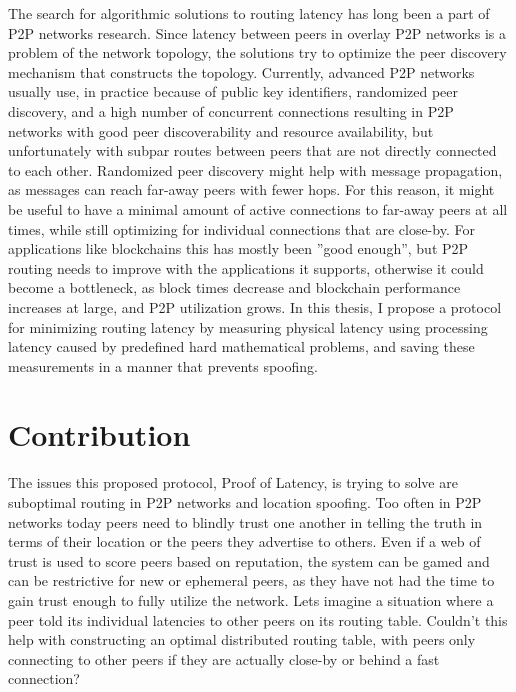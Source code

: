 The search for algorithmic solutions to routing latency has long been a part of P2P networks research. Since latency between peers in overlay P2P networks is a problem of the network topology, the solutions try to optimize the peer discovery mechanism that constructs the topology. Currently, advanced P2P networks usually use, in practice because of public key identifiers, randomized peer discovery, and a high number of concurrent connections resulting in P2P networks with good peer discoverability and resource availability, but unfortunately with subpar routes between peers that are not directly connected to each other. Randomized peer discovery might help with message propagation, as messages can reach far-away peers with fewer hops. For this reason, it might be useful to have a minimal amount of active connections to far-away peers at all times, while still optimizing for individual connections that are close-by. For applications like blockchains this has mostly been ''good enough'', but P2P routing needs to improve with the applications it supports, otherwise it could become a bottleneck, as block times decrease and blockchain performance increases at large, and P2P utilization grows. In this thesis, I propose a protocol for minimizing routing latency by measuring physical latency using processing latency caused by predefined hard mathematical problems, and saving these measurements in a manner that prevents spoofing.

\section{Contribution}
The issues this proposed protocol, Proof of Latency, is trying to solve are suboptimal routing in P2P networks and location spoofing. Too often in P2P networks today peers need to blindly trust one another in telling the truth in terms of their location or the peers they advertise to others. Even if a web of trust is used to score peers based on reputation, the system can be gamed and can be restrictive for new or ephemeral peers, as they have not had the time to gain trust enough to fully utilize the network. Lets imagine a situation where a peer told its individual latencies to other peers on its routing table. Couldn't this help with constructing an optimal distributed routing table, with peers only connecting to other peers if they are actually close-by or behind a fast connection?

